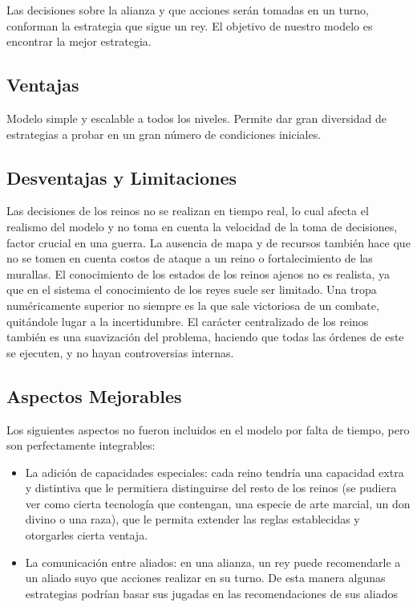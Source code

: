 \documentclass[11pt]{article}
\begin{document}
        \noindent Las decisiones sobre la alianza y que acciones serán tomadas en un turno, conforman la 
        estrategia que sigue un rey. El objetivo de nuestro modelo es encontrar la mejor estrategia.

        \subsection{Ventajas}
        Modelo simple y escalable a todos los niveles. Permite dar gran diversidad de estrategias a probar 
        en un gran número de condiciones iniciales.

        \subsection{Desventajas y Limitaciones}
        Las decisiones de los reinos no se realizan en tiempo real, lo cual afecta el realismo del modelo 
        y no toma en cuenta la velocidad de la toma de decisiones, factor crucial en una guerra. La ausencia 
        de mapa y de recursos también hace que no se tomen en cuenta costos de ataque a un reino o fortalecimiento 
        de las murallas. El conocimiento de los estados de los reinos ajenos no es realista, ya que en el sistema 
        el conocimiento de los reyes suele ser limitado. Una tropa numéricamente superior no siempre es la que 
        sale victoriosa de un combate, quitándole lugar a la incertidumbre. El carácter centralizado de los reinos 
        también es una suavización del problema, haciendo que todas las órdenes de este se ejecuten, y no hayan 
        controversias internas.

        \subsection{Aspectos Mejorables}
        Los siguientes aspectos no fueron incluidos en el modelo por falta de tiempo, pero son perfectamente 
        integrables:

        \begin{itemize}

            \item La adición de capacidades especiales: cada reino tendría una capacidad extra y distintiva 
            que le permitiera distinguirse del resto de los reinos (se pudiera ver como cierta tecnología que 
            contengan, una especie de arte marcial, un don divino o una raza), que le permita extender las 
            reglas establecidas y otorgarles cierta ventaja.

            \item La comunicación entre aliados: en una alianza, un rey puede recomendarle a un aliado suyo 
            que acciones realizar en su turno. De esta manera algunas estrategias podrían basar sus jugadas
            en las recomendaciones de sus aliados

        \end{itemize}
\end{document}
